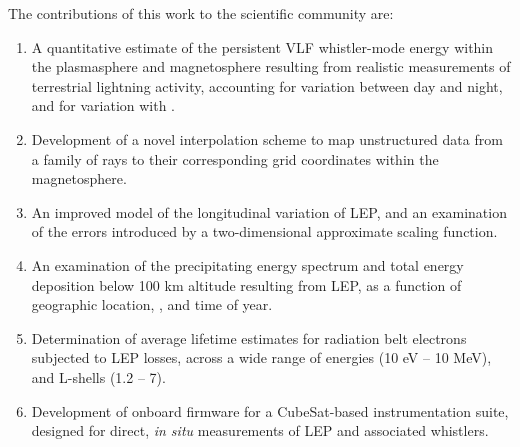 The contributions of this work to the scientific community are:
\begin{enumerate}
\item A quantitative estimate of the persistent VLF whistler-mode energy within the plasmasphere and magnetosphere resulting from realistic measurements of terrestrial lightning activity, accounting for variation between day and night, and for variation with \kp{}.

\item Development of a novel interpolation scheme to map unstructured data from a family of rays to their corresponding grid coordinates within the magnetosphere.

\item An improved model of the longitudinal variation of LEP, and an examination of the errors introduced by a two-dimensional approximate scaling function.

\item An examination of the precipitating energy spectrum and total energy deposition below 100 km altitude resulting from LEP, as a function of geographic location, \kp{}, and time of year.

\item Determination of average lifetime estimates for radiation belt electrons subjected to LEP losses, across a wide range of energies (10 eV -- 10 MeV), and L-shells (1.2 -- 7).

\item Development of onboard firmware for a CubeSat-based instrumentation suite, designed for direct, \emph{in situ} measurements of LEP and associated whistlers.
\end{enumerate}
